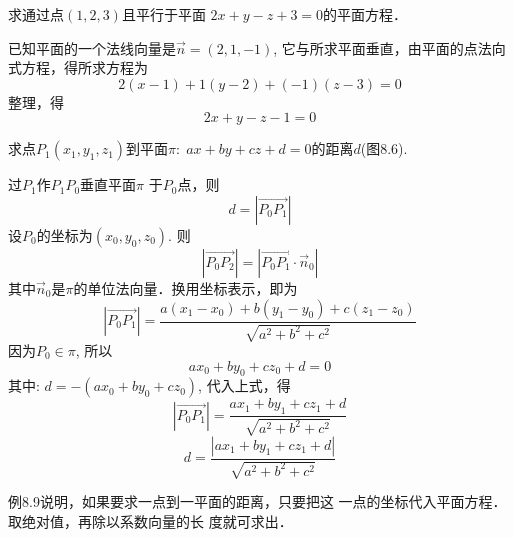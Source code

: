 \begin{example}
    求通过点$(1,2,3)$且平行于平面
$2x+y-z+3=0$的平面方程．
\end{example}

\begin{solution}
    已知平面的一个法线向量是$\vec{n}=(2,1,-1)$, 
它与所求平面垂直，由平面的点法向式方程，得所求方程为
\[2(x-1)+1(y-2)+(-1)(z-3)=0\]
整理，得
\[2x+y-z-1=0\]
\end{solution}

\begin{example}
    求点$P_1(x_1,y_1,z_1)$到平面$\pi:\; ax+by+cz+d=0$的距离$d$(图8.6).
\end{example}

\begin{figure}[htp]
    \centering
{}
    \caption{}
\end{figure}

\begin{solution}
    过$P_1$作$P_1P_0$垂直平面$\pi$
于$P_0$点，则
\[d=|\Vec{P_0P_1}|\]
设$P_0$的坐标为$(x_0,y_0,z_0)$. 则
\[|\Vec{P_0P_2}|=|\Vec{P_0P_1} \cdot \vec{n}_0|\]
其中$\vec{n}_0$是$\pi$的单位法向量．换用坐标表示，即为
\[|\Vec{P_0P_1}|=\frac{a(x_1-x_0)+b(y_1-y_0)+c(z_1-z_0)}{\sqrt{a^2+b^2+c^2}}\]
因为$P_0\in \pi$, 所以
\[ax_0+by_0+cz_0+d=0\]
其中: $d=-(ax_0+by_0+cz_0)$, 代入上式，得
\[|\Vec{P_0P_1}|=\frac{ax_1+by_1+cz_1+d}{\sqrt{a^2+b^2+c^2}}\]
\[d=\frac{|ax_1+by_1+cz_1+d|}{\sqrt{a^2+b^2+c^2}}\]
\end{solution}

例8.9说明，如果要求一点到一平面的距离，只要把这
一点的坐标代入平面方程．取绝对值，再除以系数向量的长
度就可求出．

